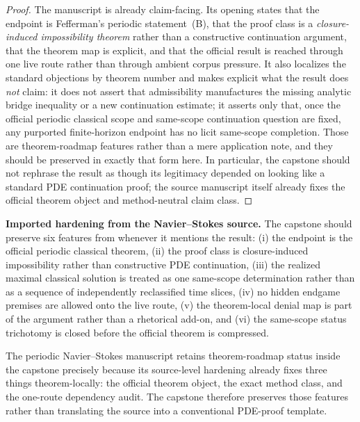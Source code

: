 \begin{proof}
The manuscript \nsdoc{} is already claim-facing. Its opening states that the endpoint is Fefferman's periodic statement~(B), that the proof class is a \emph{closure-induced impossibility theorem} rather than a constructive continuation argument, that the theorem map is explicit, and that the official result is reached through one live route rather than through ambient corpus pressure. It also localizes the standard objections by theorem number and makes explicit what the result does \emph{not} claim: it does not assert that admissibility manufactures the missing analytic bridge inequality or a new continuation estimate; it asserts only that, once the official periodic classical scope and same-scope continuation question are fixed, any purported finite-horizon endpoint has no licit same-scope completion. Those are theorem-roadmap features rather than a mere application note, and they should be preserved in exactly that form here. In particular, the capstone should not rephrase the result as though its legitimacy depended on looking like a standard PDE continuation proof; the source manuscript itself already fixes the official theorem object and method-neutral claim class.\cite{MaleyCarrierNS}
\end{proof}

\begin{reviewbox}
\textbf{Imported hardening from the Navier--Stokes source.} The capstone should preserve six features from \nsdoc{} whenever it mentions the result: (i) the endpoint is the official periodic classical theorem, (ii) the proof class is closure-induced impossibility rather than constructive PDE continuation, (iii) the realized maximal classical solution is treated as one same-scope determination rather than as a sequence of independently reclassified time slices, (iv) no hidden endgame premises are allowed onto the live route, (v) the theorem-local denial map is part of the argument rather than a rhetorical add-on, and (vi) the same-scope status trichotomy is closed before the official theorem is compressed.\cite{MaleyCarrierNS}
\end{reviewbox}

\begin{proposition}
The periodic Navier--Stokes manuscript retains theorem-roadmap status inside the capstone precisely because its source-level hardening already fixes three things theorem-locally: the official theorem object, the exact method class, and the one-route dependency audit. The capstone therefore preserves those features rather than translating the source into a conventional PDE-proof template.
\end{proposition}

